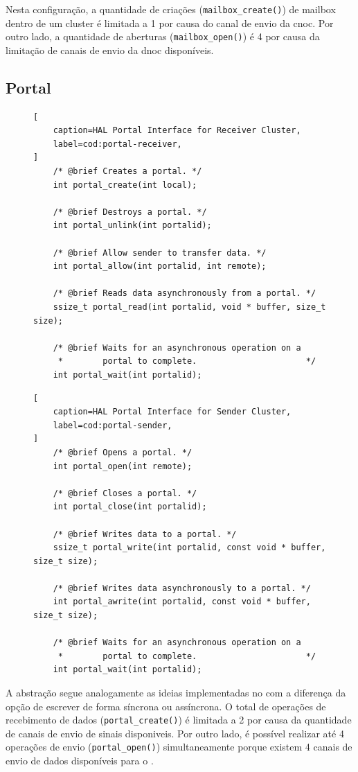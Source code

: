 		Nesta configuração, a quantidade de criações (\texttt{mailbox\_create()}) de
		mailbox dentro de um cluster é limitada a 1 por causa do canal de envio da cnoc.
		Por outro lado, a quantidade de aberturas (\texttt{mailbox\_open()}) é 4 por
		causa da limitação de canais de envio da dnoc disponíveis.

	\subsection{Portal}

\begin{figure}[t]
\begin{lstlisting}[
	caption=HAL Portal Interface for Receiver Cluster,
	label=cod:portal-receiver,
]
	/* @brief Creates a portal. */
	int portal_create(int local);

	/* @brief Destroys a portal. */
	int portal_unlink(int portalid);

	/* @brief Allow sender to transfer data. */
	int portal_allow(int portalid, int remote);

	/* @brief Reads data asynchronously from a portal. */
	ssize_t portal_read(int portalid, void * buffer, size_t size);

	/* @brief Waits for an asynchronous operation on a
	 *        portal to complete.                      */
	int portal_wait(int portalid);
\end{lstlisting}
\end{figure}

\begin{figure}[t]
\begin{lstlisting}[
	caption=HAL Portal Interface for Sender Cluster,
	label=cod:portal-sender,
]
	/* @brief Opens a portal. */
	int portal_open(int remote);

	/* @brief Closes a portal. */
	int portal_close(int portalid);

	/* @brief Writes data to a portal. */
	ssize_t portal_write(int portalid, const void * buffer, size_t size);

	/* @brief Writes data asynchronously to a portal. */
	int portal_awrite(int portalid, const void * buffer, size_t size);

	/* @brief Waits for an asynchronous operation on a
	 *        portal to complete.                      */
	int portal_wait(int portalid);
\end{lstlisting}
\end{figure}

		A abstração \portal segue analogamente as ideias implementadas
		no \mailbox com a diferença da opção de escrever de forma
		síncrona ou assíncrona.
		O total de operações de recebimento de dados (\texttt{portal\_create()})
		é limitada a 2 por causa da quantidade de canais de envio de sinais disponiveis.
		Por outro lado, é possível realizar até 4 operações de envio (\texttt{portal\_open()})
		simultaneamente porque existem 4 canais de envio de dados disponíveis para o \portal.

